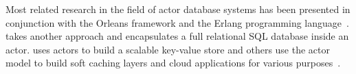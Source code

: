   Most related research in the field of actor database systems has been presented in conjunction with the Orleans framework and the Erlang programming language~\cite{Shah:reactdb,Eldeeb:transactions,Bernstein:indexing}.
   takes another approach and encapsulates a full relational SQL database inside an actor.
   uses actors to build a scalable key-value store and others use the actor model to build soft caching layers and cloud applications for various purposes~\cite{erlang_uses,akka_uses,orleans_uses}.

